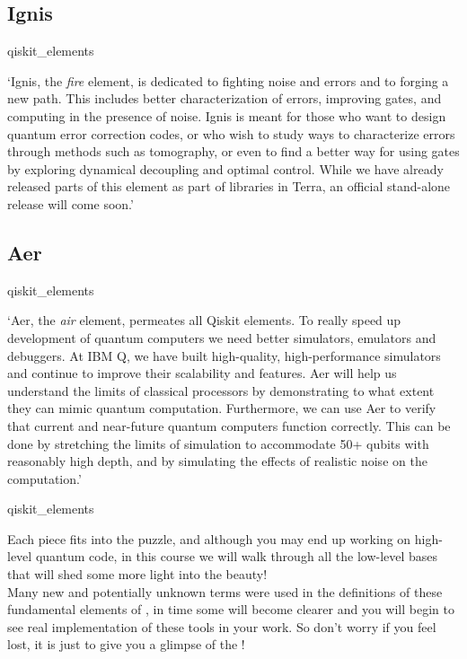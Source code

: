 \documentclass[aspectratio=43]{beamer}
\begin{document}
\subsection{\qk Ignis}
\begin{frameImg}{qiskit_elements}
    \begin{card}[\qk Ignis]
    `Ignis, the \textit{fire} element, is dedicated to fighting noise and errors and to forging a new path. This includes better characterization of errors, improving gates, and computing in the presence of noise. Ignis is meant for those who want to design quantum error correction codes, or who wish to study ways to characterize errors through methods such as tomography, or even to find a better way for using gates by exploring dynamical decoupling and optimal control. While we have already released parts of this element as part of libraries in Terra, an official stand-alone release will come soon.'
    \end{card}
\pagenumber
\end{frameImg}

\subsection{\qk Aer}
\begin{frameImg}{qiskit_elements}
    \begin{card}[\qk Aer]
        \small{`Aer, the \textit{air} element, permeates all Qiskit elements. To really speed up development of quantum computers we need better simulators, emulators and debuggers. At IBM Q, we have built high-quality, high-performance simulators and continue to improve their scalability and features. Aer will help us understand the limits of classical processors by demonstrating to what extent they can mimic quantum computation. Furthermore, we can use Aer to verify that current and near-future quantum computers function correctly. This can be done by stretching the limits of simulation to accommodate 50+ qubits with reasonably high depth, and by simulating the effects of realistic noise on the computation.'}
    \end{card}
\pagenumber
\end{frameImg}

\begin{frameImg}{qiskit_elements}
    \begin{card}[\qk Wrap-up]
    Each piece fits into the puzzle, and although you may end up working on high-level quantum code, in this course we will walk through all the low-level bases that will shed some more light into the \q beauty!\\
    Many new and potentially unknown terms were used in the definitions of these fundamental elements of \qk, in time some will become clearer and you will begin to see real implementation of these tools in your work. So don't worry if you feel lost, it is just to give you a glimpse of the \qw!
    \end{card}
\pagenumber
\end{frameImg}
\end{document}

